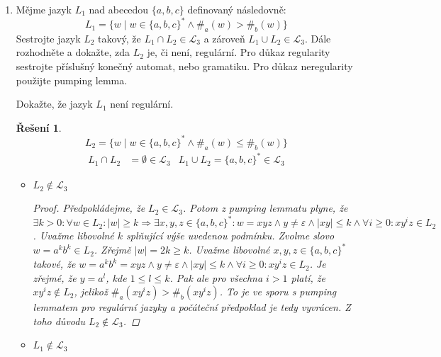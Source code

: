 \documentclass[11pt, a4paper]{article}
\theoremstyle{result}
\newtheorem*{result}{Řešení}
\begin{document}
\begin{enumerate}
    \item
    Mějme jazyk $L_1$ nad abecedou $\{a, b, c\}$ definovaný následovně:
    $$L_1 = \{w \mid w \in \{a, b, c\}^* \land \#_a(w) > \#_b(w)\}$$
    Sestrojte jazyk $L_2$ takový, že $L_1 \cap L_2 \in \mathcal{L}_3$ a zároveň $L_1 \cup L_2 \in \mathcal{L}_3$. Dále rozhodněte a dokažte, zda $L_2$ je, či není, regulární. Pro důkaz regularity sestrojte příslušný konečný automat, nebo gramatiku. Pro důkaz neregularity použijte pumping lemma.
    
    Dokažte, že jazyk $L_1$ není regulární.
    
    \begin{result}
        $$L_2 = \{w \mid w \in \{a, b, c\}^* \land \#_a(w) \leq \#_b(w)\}$$
        \begin{align*}
            L_1 \cap L_2 &= \emptyset \in \mathcal{L}_3 & L_1 \cup L_2 = \{a, b, c\}^* \in \mathcal{L}_3
        \end{align*}
        
        \begin{itemize}
            \item $L_2 \notin \mathcal{L}_3$
            
            \begin{proof}
            Předpokládejme, že $L_2 \in \mathcal{L}_3$. Potom z pumping lemmatu plyne, že $\exists k > 0: \forall w \in L_2: |w| \ge k \Rightarrow \exists x, y, z \in \{a, b, c\}^*: w = xyz \land y \neq \varepsilon \land |xy| \leq k \land \forall i \geq 0: xy^iz \in L_2$. Uvažme libovolné $k$ splňující výše uvedenou podmínku. Zvolme slovo $w = a^kb^k \in L_2$. Zřejmě $|w| = 2k \ge k$. Uvažme libovolné $x, y, z \in \{a, b, c\}^*$ takové, že $w = a^kb^k = xyz \land y \neq \varepsilon \land |xy| \leq k \land \forall i \ge 0: xy^iz \in L_2$. Je zřejmé, že $y = a^l$, kde $1 \le l \le k$. Pak ale pro všechna $i > 1$ platí, že $xy^iz \notin L_2$, jelikož $\#_a(xy^iz) > \#_b(xy^iz)$. To je ve sporu s pumping lemmatem pro regulární jazyky a počáteční předpoklad je tedy vyvrácen. Z toho důvodu $L_2 \notin \mathcal{L}_3$.
            \end{proof}
            
            \item $L_1 \notin \mathcal{L}_3$
            

\end{itemize}
\end{result}
\end{enumerate}
\end{document}
